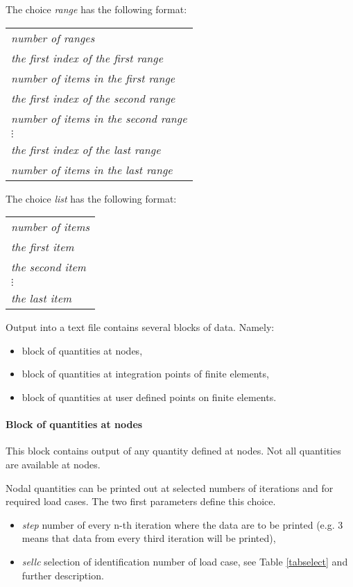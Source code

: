 The choice {\it range} has the following format:

\begin{tabular}{l}
{\it number of ranges}
\\
{\it the first index of the first range}
\\
{\it number of items in the first range}
\\
{\it the first index of the second range}
\\
{\it number of items in the second range}
\\
$\vdots$
\\
{\it the first index of the last range}
\\
{\it number of items in the last range}
\\
\end{tabular}

The choice {\it list} has the following format:

\begin{tabular}{l}
{\it number of items}
\\
{\it the first item}
\\
{\it the second item}
\\
$\vdots$
\\
{\it the last item}
\\
\end{tabular}

Output into a text file contains several blocks of data. Namely:
\begin{itemize}
\item block of quantities at nodes,
\item block of quantities at integration points of finite elements,
\item block of quantities at user defined points on finite elements.
\end{itemize}

\paragraph{Block of quantities at nodes}
This block contains output of any quantity defined at nodes. Not all quantities are available
at nodes.

Nodal quantities can be printed out at selected numbers of iterations and for required
load cases. The two first parameters define this choice.
\begin{itemize}
\item[] {\it step} number of every n-th iteration where the data are to be printed (e.g. 3 means that data from
every third iteration will be printed),
\item[] {\it sellc} selection of identification number of load case,
see Table \ref{tabselect} and further description.
\end{itemize}

